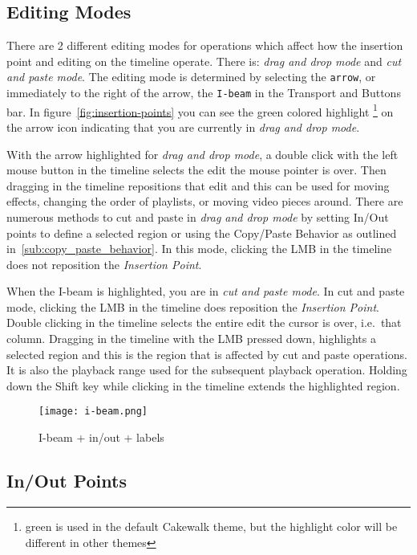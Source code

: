 \subsection{Editing Modes}%
\label{sub:editing_modes}

There are 2 different editing modes for operations which affect how the insertion point and editing
on the timeline operate.  
There is:  \emph{drag and drop mode} and \emph{cut and paste mode}. 
The editing mode is determined by selecting the \texttt{arrow}, or immediately to the right of the arrow,
the \texttt{I-beam} in the Transport and Buttons bar. In figure~\ref{fig:insertion-points} you can see
the green colored highlight \protect\footnote{green is used in the default Cakewalk theme, but the highlight color will be different in other themes} on the arrow icon indicating that you are currently in 
\emph{drag and drop mode}.

With the arrow highlighted for \emph{drag and drop mode}, a double click with the left mouse button in the timeline selects the edit the mouse pointer is over. 
Then dragging in the timeline repositions that edit and this can be used for moving effects,
changing the order of playlists, or moving video pieces around. 
There are numerous methods to cut and paste in \emph{drag and drop mode} by setting In/Out points to define
a selected region or using the Copy/Paste Behavior as outlined in~\ref{sub:copy_paste_behavior}. 
In this mode, clicking the LMB in the timeline does not reposition the \textit{Insertion Point}. 

When the I-beam is highlighted, you are in \emph{cut and paste mode}.
In cut and paste mode, clicking the LMB in the timeline does reposition the \textit{Insertion Point}. 
Double clicking in the timeline selects the entire edit the cursor is over, i.e.\ that column. 
Dragging in the timeline with the LMB pressed down, highlights a selected region and this is the region that is affected by cut
and paste operations.  It is also the playback range used for the subsequent playback operation. 
Holding down the Shift key while clicking in the timeline extends the highlighted region.

\begin{figure}[htpb]
    \centering
    \texttt{[image: i-beam.png]}
    \caption{I-beam + in/out  +  labels}
    \label{fig:i-beam}
\end{figure}

\subsection{In/Out Points}%
\label{sub:in_out_points}

